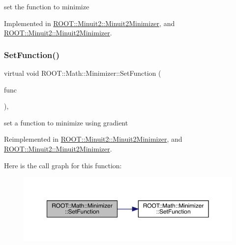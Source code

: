 set the function to minimize 



Implemented in \mbox{\hyperlink{classROOT_1_1Minuit2_1_1Minuit2Minimizer_ae18efc66a943fe11b1114ff8c1b28ad0}{R\+O\+O\+T\+::\+Minuit2\+::\+Minuit2\+Minimizer}}, and \mbox{\hyperlink{classROOT_1_1Minuit2_1_1Minuit2Minimizer_ae18efc66a943fe11b1114ff8c1b28ad0}{R\+O\+O\+T\+::\+Minuit2\+::\+Minuit2\+Minimizer}}.

\mbox{\label{classROOT_1_1Math_1_1Minimizer_a1d9ff15aa732e518a60a05dcbd82c34a}} 
\subsubsection{\texorpdfstring{SetFunction()}{SetFunction()}\hspace{0.1cm}{\footnotesize\ttfamily [3/4]}}
{\footnotesize\ttfamily virtual void R\+O\+O\+T\+::\+Math\+::\+Minimizer\+::\+Set\+Function (\begin{DoxyParamCaption}\item[{const \mbox{\hyperlink{namespaceROOT_1_1Math_a014e019aaf9304a00e9231bd9ed232fb}{R\+O\+O\+T\+::\+Math\+::\+I\+Multi\+Grad\+Function}} \&}]{func }\end{DoxyParamCaption})\hspace{0.3cm}{\ttfamily [inline]}, {\ttfamily [virtual]}}



set a function to minimize using gradient 



Reimplemented in \mbox{\hyperlink{classROOT_1_1Minuit2_1_1Minuit2Minimizer_aeb98c40cf3486fe8fb9bec4da0f7942e}{R\+O\+O\+T\+::\+Minuit2\+::\+Minuit2\+Minimizer}}, and \mbox{\hyperlink{classROOT_1_1Minuit2_1_1Minuit2Minimizer_aeb98c40cf3486fe8fb9bec4da0f7942e}{R\+O\+O\+T\+::\+Minuit2\+::\+Minuit2\+Minimizer}}.

Here is the call graph for this function\+:
\nopagebreak
\begin{figure}[H]
\begin{center}
\leavevmode
\includegraphics[width=350pt]{dc/dc4/classROOT_1_1Math_1_1Minimizer_a1d9ff15aa732e518a60a05dcbd82c34a_cgraph}
\end{center}
\end{figure}
\mbox{\label{classROOT_1_1Math_1_1Minimizer_a1d9ff15aa732e518a60a05dcbd82c34a}} 
